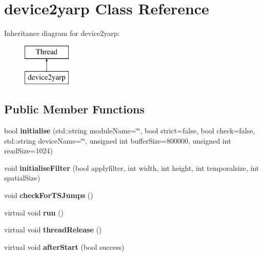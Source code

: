 \hypertarget{classdevice2yarp}{}\section{device2yarp Class Reference}
\label{classdevice2yarp}
Inheritance diagram for device2yarp\+:\begin{figure}[H]
\begin{center}
\leavevmode
\includegraphics[height=2.000000cm]{classdevice2yarp}
\end{center}
\end{figure}
\subsection*{Public Member Functions}
\begin{DoxyCompactItemize}
\item 
bool {\bfseries initialise} (std\+::string module\+Name=\char`\"{}\char`\"{}, bool strict=false, bool check=false, std\+::string device\+Name=\char`\"{}\char`\"{}, unsigned int buffer\+Size=800000, unsigned int read\+Size=1024)\hypertarget{classdevice2yarp_ab94cdfb71b80d35005b43d42276266e1}{}\label{classdevice2yarp_ab94cdfb71b80d35005b43d42276266e1}

\item 
void {\bfseries initialise\+Filter} (bool applyfilter, int width, int height, int temporalsize, int spatial\+Size)\hypertarget{classdevice2yarp_ad4edcff27efc43f04cc4cc29ae240746}{}\label{classdevice2yarp_ad4edcff27efc43f04cc4cc29ae240746}

\item 
void {\bfseries check\+For\+T\+S\+Jumps} ()\hypertarget{classdevice2yarp_a8f5015246040644a2bf7fcbf9a305a8a}{}\label{classdevice2yarp_a8f5015246040644a2bf7fcbf9a305a8a}

\item 
virtual void {\bfseries run} ()\hypertarget{classdevice2yarp_aa01eb91fc90a62cb29df3fdc8387cb54}{}\label{classdevice2yarp_aa01eb91fc90a62cb29df3fdc8387cb54}

\item 
virtual void {\bfseries thread\+Release} ()\hypertarget{classdevice2yarp_ae429ee3f9ab68ceea96daf63553e7700}{}\label{classdevice2yarp_ae429ee3f9ab68ceea96daf63553e7700}

\item 
virtual void {\bfseries after\+Start} (bool success)\hypertarget{classdevice2yarp_a1098424f146070180d0681787b771451}{}\label{classdevice2yarp_a1098424f146070180d0681787b771451}

\end{DoxyCompactItemize}


